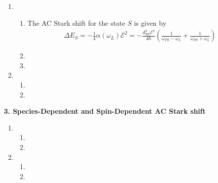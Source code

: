\documentclass{article}
\theoremstyle{definition}
\newcommand{\al}{\alpha}
\newcommand{\f}[2]{\frac{#1}{#2}}
\newcommand{\lp}{\left(}
\newcommand{\rp}{\right)}
\begin{document}
\begin{enumerate}[label=(\alph*)]
	\item 
	
	\begin{enumerate}[label=(\roman*)]
		\item The AC Stark shift for the state $S$ is given by 
		\begin{align*}
			\Delta E_S = -\f{1}{4}\al(\omega_L) \mathcal{E}^2 = -\f{d_{PS}^2\mathcal{E}^2}{4\hbar}\lp \f{1}{\omega_{PS} - \omega_L} + \f{1}{\omega_{PS} + \omega_L} \rp
		\end{align*}
		
		\item 
		
		\item 
	\end{enumerate}
	
	\item 
	
	\begin{enumerate}[label=(\roman*)]
		\item 
		
		\item 
		
		
	\end{enumerate}
\end{enumerate}


\noindent \textbf{3. Species-Dependent and Spin-Dependent AC Stark shift}	
	
\begin{enumerate}[label=(\alph*)]
	\item 
	
	\begin{enumerate}[label=(\roman*)]
		\item 
		
		\item 
		

	\end{enumerate}
	
	\item 
	
	\begin{enumerate}[label=(\roman*)]
		\item 
		
		\item 
		
		
	\end{enumerate}
\end{enumerate}
	
	
\end{document}
